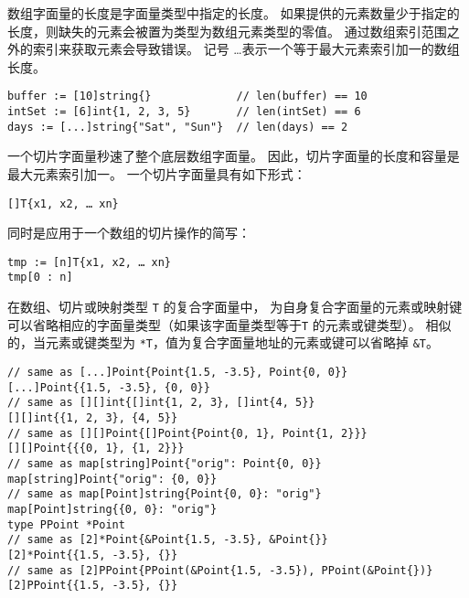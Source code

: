 数组字面量的长度是字面量类型中指定的长度。
如果提供的元素数量少于指定的长度，则缺失的元素会被置为类型为数组元素类型的零值。
通过数组索引范围之外的索引来获取元素会导致错误。
记号 \ldots 表示一个等于最大元素索引加一的数组长度。
\begin{lstlisting}[style=golang]
buffer := [10]string{}             // len(buffer) == 10
intSet := [6]int{1, 2, 3, 5}       // len(intSet) == 6
days := [...]string{"Sat", "Sun"}  // len(days) == 2
\end{lstlisting}

一个切片字面量秒速了整个底层数组字面量。
因此，切片字面量的长度和容量是最大元素索引加一。
一个切片字面量具有如下形式：
\begin{lstlisting}[style=golang]
[]T{x1, x2, … xn}
\end{lstlisting}
同时是应用于一个数组的切片操作的简写：
\begin{lstlisting}[style=golang]
tmp := [n]T{x1, x2, … xn}
tmp[0 : n]
\end{lstlisting}

在数组、切片或映射类型 \lstinline|T| 的复合字面量中，
为自身复合字面量的元素或映射键可以省略相应的字面量类型（如果该字面量类型等于\lstinline|T| 的元素或键类型）。
相似的，当元素或键类型为 \lstinline|*T|，值为复合字面量地址的元素或键可以省略掉 \lstinline|&T|。
\begin{lstlisting}[style=golang]
// same as [...]Point{Point{1.5, -3.5}, Point{0, 0}}
[...]Point{{1.5, -3.5}, {0, 0}}
// same as [][]int{[]int{1, 2, 3}, []int{4, 5}}
[][]int{{1, 2, 3}, {4, 5}}
// same as [][]Point{[]Point{Point{0, 1}, Point{1, 2}}}
[][]Point{{{0, 1}, {1, 2}}}
// same as map[string]Point{"orig": Point{0, 0}}
map[string]Point{"orig": {0, 0}}
// same as map[Point]string{Point{0, 0}: "orig"}
map[Point]string{{0, 0}: "orig"}    
type PPoint *Point
// same as [2]*Point{&Point{1.5, -3.5}, &Point{}}
[2]*Point{{1.5, -3.5}, {}}
// same as [2]PPoint{PPoint(&Point{1.5, -3.5}), PPoint(&Point{})}
[2]PPoint{{1.5, -3.5}, {}}
\end{lstlisting}

